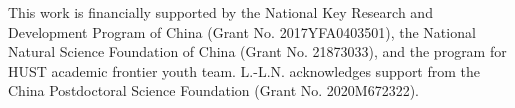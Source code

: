 \documentclass[aps,prb,
superscriptaddress,
,twocolumn
,floatfix,footinbib,longbibliography,
]{revtex4-2}
\begin{document}


\begin{acknowledgments}
This work is financially supported by the National Key Research and Development Program of China (Grant No. 2017YFA0403501), the National Natural Science Foundation of China (Grant No. 21873033), and the program for HUST academic frontier youth team. L.-L.N. acknowledges support from the China Postdoctoral Science Foundation (Grant No. 2020M672322).
\end{acknowledgments}

%


\end{document}
